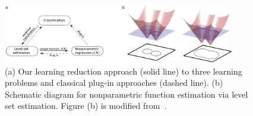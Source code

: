 \documentclass[11pt]{article}
\theoremstyle{definition}
\begin{document}
\begin{figure}\centering
\includegraphics[width=0.9\textwidth]{level.pdf}\hspace{1cm}
\caption{(a) Our learning reduction approach (solid line) to three learning problems and classical plug-in approaches (dashed line). (b) Schematic diagram for nonparametric function estimation via level set estimation. Figure (b) is modified from~\cite{gibou2018review}. }\label{fig:diagram}
\end{figure}

\vspace{-.5cm}
\end{document}
